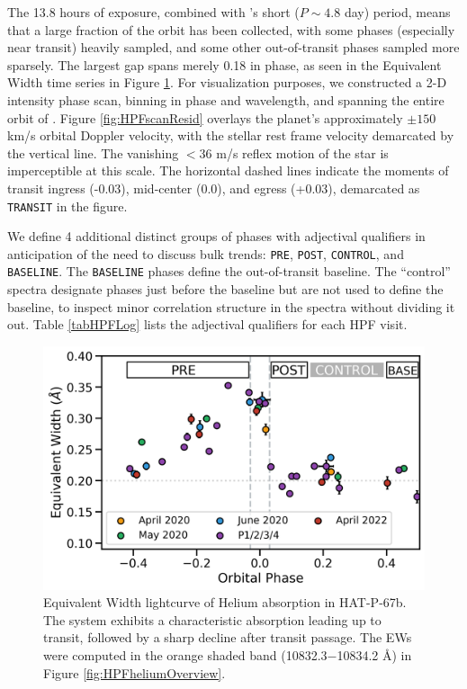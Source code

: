 \documentclass[linenumbers, twocolumn, trackchanges]{aastex631}
\begin{document}
The 13.8 hours of exposure, combined with 's short ($P\sim4.8$ day) period, means that a large fraction of the orbit has been collected, with some phases (especially near transit) heavily sampled, and some other out-of-transit phases sampled more sparsely. The largest gap spans merely 0.18 in phase, as seen in the Equivalent Width time series in Figure \ref{fig:HPFtimeseries}.  For visualization purposes, we constructed a 2-D intensity phase scan, binning in phase and wavelength, and spanning the entire orbit of .  Figure \ref{fig:HPFscanResid} overlays the planet's approximately $\pm150\;$km/s orbital Doppler velocity, with the stellar rest frame velocity demarcated by the vertical line.  The vanishing $<36$ m/s reflex motion of the star is imperceptible at this scale.  The horizontal dashed lines indicate the moments of transit ingress (-0.03), mid-center (0.0), and egress (+0.03), demarcated as \texttt{TRANSIT} in the figure.

We define 4 additional distinct groups of phases with adjectival qualifiers in anticipation of the need to discuss bulk trends: \texttt{PRE}, \texttt{POST}, \texttt{CONTROL}, and \texttt{BASELINE}.  The \texttt{BASELINE} phases define the out-of-transit baseline.  The ``control'' spectra designate phases just before the baseline but are not used to define the baseline, to inspect minor correlation structure in the spectra without dividing it out.  Table \ref{tabHPFLog} lists the adjectival qualifiers for each HPF visit.

\begin{figure}
  \includegraphics[width=\linewidth]{HAT_P_67b_Helium10830EW_byCampaign.png}
  \caption{Equivalent Width lightcurve of Helium absorption in HAT-P-67b.  The system exhibits a characteristic absorption leading up to transit, followed by a sharp decline after transit passage.  The EWs were computed in the orange shaded band (10832.3$-$10834.2 \AA) in Figure \ref{fig:HPFheliumOverview}.}
  \label{fig:HPFtimeseries}
\end{figure}
\end{document}
